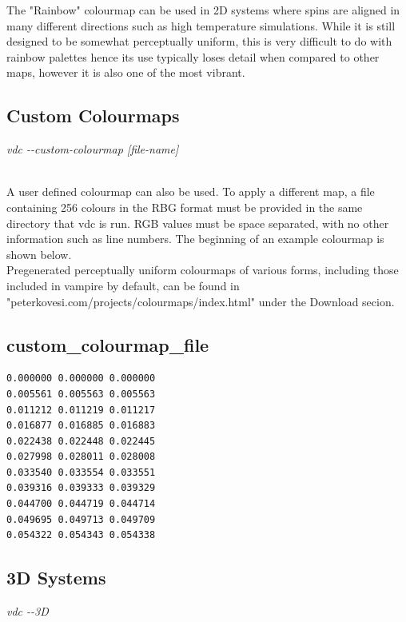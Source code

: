 The "Rainbow" colourmap can be used in 2D systems where spins are aligned in many different directions such as high temperature simulations. While it is still designed to be somewhat perceptually uniform, this is very difficult to do with rainbow palettes hence its use typically loses detail when compared to other maps, however it is also one of the most vibrant. \\

\subsection*{Custom Colourmaps}

\begin{minipage}[c]{\textwidth}
\centering
\textit{vdc -{}-custom-colourmap [file-name]}
\end{minipage}\\

A user defined colourmap can also be used. To apply a different map, a file containing 256 colours in the RBG format must be provided in the same directory that vdc is run. RGB values must be space separated, with no other information such as line numbers. The beginning of an example colourmap is shown below. \\

Pregenerated perceptually uniform colourmaps of various forms, including those included in vampire by default, can be found in "peterkovesi.com/projects/colourmaps/index.html" under the Download secion. \\

\subsection*{custom\_colourmap\_file}
{\footnotesize
\begin{verbatim}
0.000000 0.000000 0.000000
0.005561 0.005563 0.005563
0.011212 0.011219 0.011217
0.016877 0.016885 0.016883
0.022438 0.022448 0.022445
0.027998 0.028011 0.028008
0.033540 0.033554 0.033551
0.039316 0.039333 0.039329
0.044700 0.044719 0.044714
0.049695 0.049713 0.049709
0.054322 0.054343 0.054338
\end{verbatim}
}

\subsection*{3D Systems}

\begin{minipage}[c]{\textwidth}
\centering
\textit{vdc -{}-3D}
\end{minipage}\\


